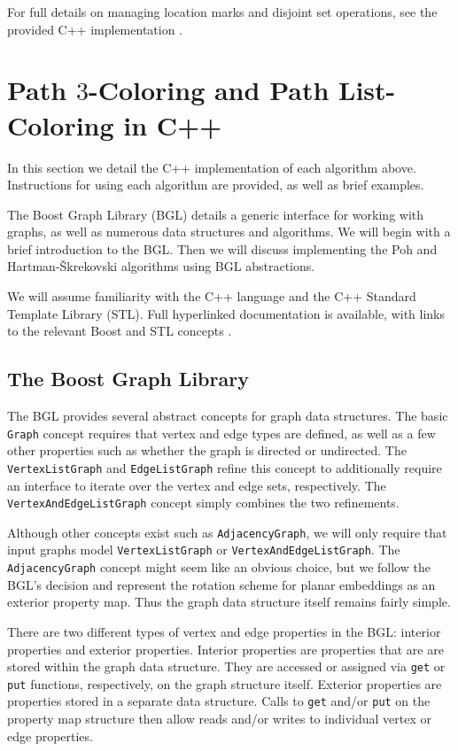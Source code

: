\documentclass[letterpaper, 12pt]{article}
\theoremstyle{thm}
\begin{document}
For full details on managing location marks and disjoint set operations, see the
provided C++ implementation \cite{code}.

\section{Path $3$-Coloring and Path List-Coloring in C++}

In this section we detail the C++ implementation of each algorithm above.
Instructions for using each algorithm are provided, as well as brief examples.

The Boost Graph Library (BGL) \cite{boost} details a generic interface for working
with graphs, as well as numerous data structures and algorithms. We will begin
with a brief introduction to the BGL. Then we will
discuss implementing the Poh and Hartman-\v{S}krekovski algorithms using BGL
abstractions.

We will assume familiarity with the C++ language and the
C++ Standard Template Library (STL). Full hyperlinked documentation is
available, with links to the relevant Boost and STL concepts \cite{code}.

\subsection{The Boost Graph Library}

The BGL provides several abstract concepts for graph data structures.
The basic \texttt{Graph} concept requires that vertex and edge types are
defined, as well as a few other properties such as whether the graph is directed or
undirected. The \texttt{VertexListGraph} and \texttt{EdgeListGraph} refine this
concept to additionally require an interface to iterate over the vertex and
edge sets, respectively. The \texttt{VertexAndEdgeListGraph} concept simply
combines the two refinements.

Although other concepts exist such as
\texttt{AdjacencyGraph}, we will only require that input graphs model
\texttt{VertexListGraph} or \texttt{VertexAndEdgeListGraph}. The
\texttt{Adjacency{\allowbreak}Graph} concept might seem like an obvious choice,
but we follow the BGL's decision and represent the rotation scheme for planar
embeddings as an exterior property map. Thus the graph data structure itself
remains fairly simple.

There are two different types of vertex and edge properties in the BGL: interior
properties and exterior properties. Interior properties are properties that are
are stored within the graph data structure. They are accessed or
assigned via \texttt{get} or \texttt{put} functions, respectively, on the graph
structure itself. Exterior properties are properties stored in a separate data
structure. Calls to \texttt{get} and/or \texttt{put} on the property map structure
then allow reads and/or writes to individual vertex or edge properties.
\end{document}
